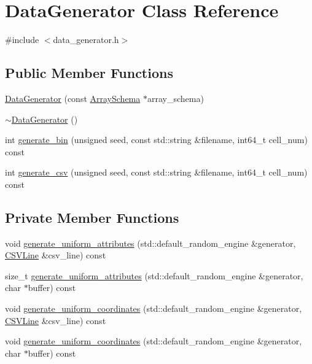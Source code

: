 \hypertarget{classDataGenerator}{}\section{Data\+Generator Class Reference}
\label{classDataGenerator}


{\ttfamily \#include $<$data\+\_\+generator.\+h$>$}

\subsection*{Public Member Functions}
\begin{DoxyCompactItemize}
\item 
\hyperlink{classDataGenerator_a3a85eb5bf95cf3a6ba07333d0da37207}{Data\+Generator} (const \hyperlink{classArraySchema}{Array\+Schema} $\ast$array\+\_\+schema)
\item 
\hyperlink{classDataGenerator_a1f847009ec0e063e0fa955d1936b9724}{$\sim$\+Data\+Generator} ()
\item 
int \hyperlink{classDataGenerator_a4acccc9fff235dd48ff1c5c413f661cf}{generate\+\_\+bin} (unsigned seed, const std\+::string \&filename, int64\+\_\+t cell\+\_\+num) const 
\item 
int \hyperlink{classDataGenerator_a5fa22f5e55efcda7b099c89f8c5503d0}{generate\+\_\+csv} (unsigned seed, const std\+::string \&filename, int64\+\_\+t cell\+\_\+num) const 
\end{DoxyCompactItemize}
\subsection*{Private Member Functions}
\begin{DoxyCompactItemize}
\item 
void \hyperlink{classDataGenerator_a3c76c4329a15aae596cacf55a7d7d4d4}{generate\+\_\+uniform\+\_\+attributes} (std\+::default\+\_\+random\+\_\+engine \&generator, \hyperlink{classCSVLine}{C\+S\+V\+Line} \&csv\+\_\+line) const 
\item 
size\+\_\+t \hyperlink{classDataGenerator_a21f9c45b4a9398b190f55fb35bd49e4d}{generate\+\_\+uniform\+\_\+attributes} (std\+::default\+\_\+random\+\_\+engine \&generator, char $\ast$buffer) const 
\item 
void \hyperlink{classDataGenerator_ad3f5e9e61b448a0279ba06582ee94b0c}{generate\+\_\+uniform\+\_\+coordinates} (std\+::default\+\_\+random\+\_\+engine \&generator, \hyperlink{classCSVLine}{C\+S\+V\+Line} \&csv\+\_\+line) const 
\item 
void \hyperlink{classDataGenerator_a629304eaf77d3d38da1da55245c70f61}{generate\+\_\+uniform\+\_\+coordinates} (std\+::default\+\_\+random\+\_\+engine \&generator, char $\ast$buffer) const 
\end{DoxyCompactItemize}
